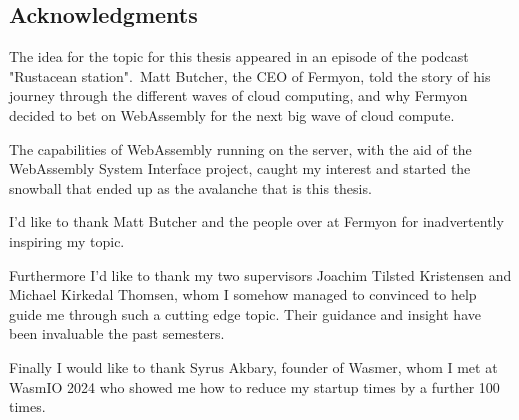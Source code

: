 \documentclass[
  table]{report}
\begin{document}
\newpage

\vspace*{\fill}
\begin{center}
\begin{minipage}{0.75\textwidth}

\chapter*{Acknowledgments}


The idea for the topic for this thesis appeared in an episode of the podcast
"Rustacean station". Matt Butcher, the CEO of Fermyon, told the story of his
journey through the different waves of cloud computing, and why Fermyon 
decided to bet on WebAssembly for the next big wave of cloud compute.

\vspace{0.25cm}

The capabilities of WebAssembly running on the server, with the aid of
the WebAssembly System Interface project, caught my interest and started 
the snowball that ended up as the avalanche that is this thesis. 

\vspace{0.25cm}

I'd like to thank Matt Butcher and the people over at Fermyon for inadvertently 
inspiring my topic. 

\vspace{0.25cm}

Furthermore I'd like to thank my two supervisors Joachim Tilsted Kristensen and 
Michael Kirkedal Thomsen, whom I somehow managed to convinced to help guide me 
through such a cutting edge topic. Their guidance and insight have been
invaluable the past semesters. 

\vspace{0.25cm}


Finally I would like to thank Syrus Akbary, founder of Wasmer, whom I met at
WasmIO 2024 who showed me how to reduce my startup times by a further 100 times.

\end{minipage}
\end{center}
\vspace*{\fill}

\newpage

\tableofcontents

\newpage

\listoffigures

\newpage
\end{document}
